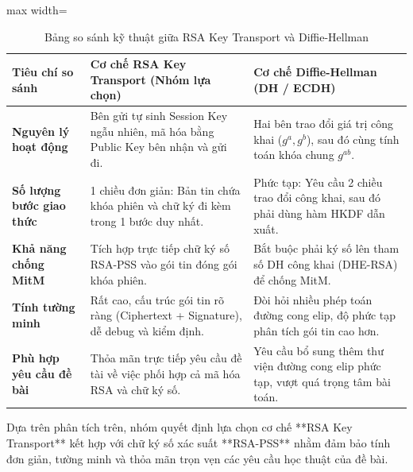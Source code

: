 \documentclass[a4paper,12pt]{article}
\renewcommand{\arraystretch}{1.2}
\begin{document}
\begin{table}[H]
\centering
\renewcommand{\arraystretch}{1.2}
\begin{adjustbox}{max width=\textwidth}
\begin{tabular}{|l|p{6.5cm}|p{6.5cm}|}
\hline
\textbf{Tiêu chí so sánh} & \textbf{Cơ chế RSA Key Transport (Nhóm lựa chọn)} & \textbf{Cơ chế Diffie-Hellman (DH / ECDH)} \\ \hline
\textbf{Nguyên lý hoạt động} & Bên gửi tự sinh Session Key ngẫu nhiên, mã hóa bằng Public Key bên nhận và gửi đi. & Hai bên trao đổi giá trị công khai ($g^a, g^b$), sau đó cùng tính toán khóa chung $g^{ab}$. \\ \hline
\textbf{Số lượng bước giao thức} & 1 chiều đơn giản: Bản tin chứa khóa phiên và chữ ký đi kèm trong 1 bước duy nhất. & Phức tạp: Yêu cầu 2 chiều trao đổi công khai, sau đó phải dùng hàm HKDF dẫn xuất. \\ \hline
\textbf{Khả năng chống MitM} & Tích hợp trực tiếp chữ ký số RSA-PSS vào gói tin đóng gói khóa phiên. & Bắt buộc phải ký số lên tham số DH công khai (DHE-RSA) để chống MitM. \\ \hline
\textbf{Tính tường minh} & Rất cao, cấu trúc gói tin rõ ràng (Ciphertext + Signature), dễ debug và kiểm định. & Đòi hỏi nhiều phép toán đường cong elip, độ phức tạp phân tích gói tin cao hơn. \\ \hline
\textbf{Phù hợp yêu cầu đề bài} & Thỏa mãn trực tiếp yêu cầu đề tài về việc phối hợp cả mã hóa RSA và chữ ký số. & Yêu cầu bổ sung thêm thư viện đường cong elip phức tạp, vượt quá trọng tâm bài toán. \\ \hline
\end{tabular}
\end{adjustbox}
\caption{Bảng so sánh kỹ thuật giữa RSA Key Transport và Diffie-Hellman}
\label{tab:crypto_comparison}
\end{table}

Dựa trên phân tích trên, nhóm quyết định lựa chọn cơ chế **RSA Key Transport** kết hợp với chữ ký số xác suất **RSA-PSS** nhằm đảm bảo tính đơn giản, tường minh và thỏa mãn trọn vẹn các yêu cầu học thuật của đề bài.
\end{document}
